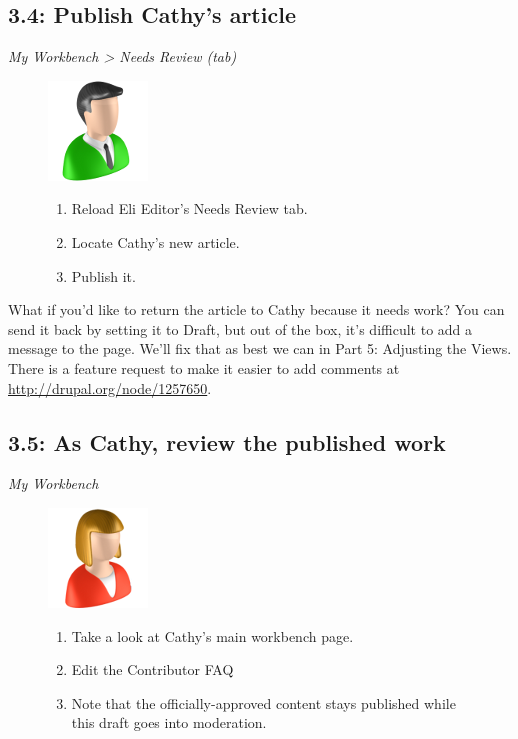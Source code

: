 \documentclass[letterpaper,10pt,english]{sphinxmanual}
\begin{document}
\subsection{3.4: Publish Cathy's article}
\label{workbench:publish-cathy-s-article}
\emph{My Workbench \textgreater{} Needs Review (tab)}
\begin{figure}[htbp]
\centering

\includegraphics{editor.png}
{\small \begin{enumerate}
\item {} 
Reload Eli Editor's Needs Review tab.

\item {} 
Locate Cathy's new article.

\item {} 
Publish it.

\end{enumerate}
}\end{figure}

What if you'd like to return the article to Cathy because it needs work? You can send it back by setting it to Draft, but out of the box, it's difficult to add a message to the page. We'll fix that as best we can in Part 5: Adjusting the Views. There is a feature request to make it easier to add comments at \href{http://drupal.org/node/1257650}{http://drupal.org/node/1257650}.


\subsection{3.5: As Cathy, review the published work}
\label{workbench:as-cathy-review-the-published-work}
\emph{My Workbench}
\begin{figure}[htbp]
\centering

\includegraphics{contributor.png}
{\small \begin{enumerate}
\item {} 
Take a look at Cathy's main workbench page.

\item {} 
Edit the Contributor FAQ

\item {} 
Note that the officially-approved content stays published while this draft goes into moderation.

\end{enumerate}
}\end{figure}
\end{document}

